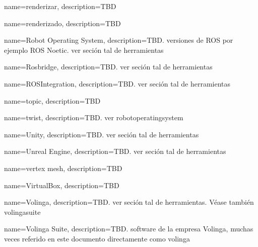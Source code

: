 {
    name={renderizar},
    description={TBD}
}

{
    name={renderizado},
    description={TBD}
}

{
    name={Robot Operating System},
    description={TBD. versiones de ROS por ejemplo ROS Noetic. ver seción tal de herramientas}
}

{
    name={Rosbridge},
    description={TBD. ver seción tal de herramientas}
}

{
    name={ROSIntegration},
    description={TBD. ver seción tal de herramientas}
}



{
    name={topic},
    description={TBD}
}

{
    name={twist},
    description={TBD. ver \gls{robotoperatingsystem}}
}


{
    name={Unity},
    description={TBD. ver seción tal de herramientas}
}

{
    name={Unreal Engine},
    description={TBD. ver seción tal de herramientas}
}


{
    name={vertex \gls{mesh}},
    description={TBD}
}

{
    name={VirtualBox},
    description={TBD}
}

{
    name={Volinga},
    description={TBD. ver seción tal de herramientas. Véase también \gls{volingasuite}}
}

{
    name={Volinga Suite},
    description={TBD. software de la empresa Volinga, muchas veces referido en este documento directamente como \gls{volinga}}
}





